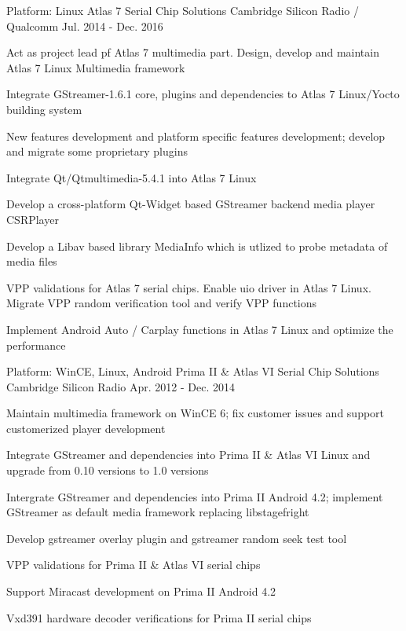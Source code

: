 \begin{cventries}
  \cventry
    {Platform: Linux} %
    {Atlas 7 Serial Chip Solutions} %
    {Cambridge Silicon Radio / Qualcomm} %
    {Jul. 2014 - Dec. 2016} %
    {
      \begin{cvitems} %
        \item {Act as project lead pf Atlas 7 multimedia part. Design, develop and maintain Atlas 7 Linux Multimedia framework}
        \item {Integrate GStreamer-1.6.1 core, plugins and dependencies to Atlas 7 Linux/Yocto building system}
        \item {New features development and platform specific features development; develop and migrate some proprietary plugins}
        \item {Integrate Qt/Qtmultimedia-5.4.1 into Atlas 7 Linux}
        \item {Develop a cross-platform Qt-Widget based GStreamer backend media player CSRPlayer}
        \item {Develop a Libav based library MediaInfo which is utlized to probe metadata of media files}
        \item {VPP validations for Atlas 7 serial chips. Enable uio driver in Atlas 7 Linux. Migrate VPP random verification tool and verify VPP functions}
		\item {Implement Android Auto / Carplay functions in Atlas 7 Linux and optimize the performance}
      \end{cvitems}
    }

  \cventry
    {Platform: WinCE, Linux, Android} %
    {Prima II \& Atlas VI Serial Chip Solutions} %
    {Cambridge Silicon Radio} %
    {Apr. 2012 - Dec. 2014} %
    {
      \begin{cvitems} %
        \item {Maintain multimedia framework on WinCE 6; fix customer issues and support customerized player development}
        \item {Integrate GStreamer and dependencies into Prima II \& Atlas VI Linux and upgrade from 0.10 versions to 1.0 versions}
        \item {Intergrate GStreamer and dependencies into Prima II Android 4.2; implement GStreamer as default media framework replacing libstagefright}
		\item {Develop gstreamer overlay plugin and gstreamer random seek test tool}
        \item {VPP validations for Prima II \& Atlas VI serial chips}
		\item {Support Miracast development on Prima II Android 4.2}
        \item {Vxd391 hardware decoder verifications for Prima II serial chips}
      \end{cvitems}
    }


\end{cventries}
